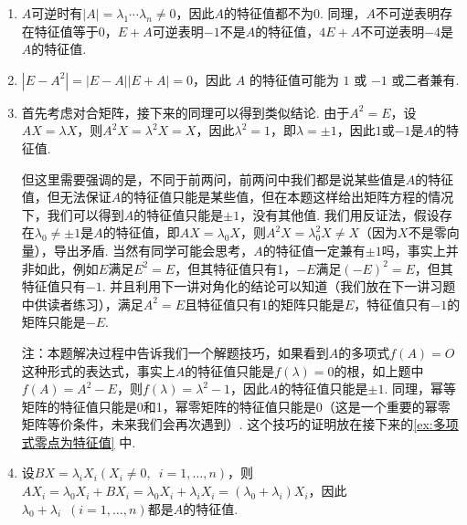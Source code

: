 \begin{solution}
    \begin{enumerate}
        \item $A$可逆时有$|A|=\lambda_1\cdots\lambda_n\neq 0$，因此$A$的特征值都不为0. 同理，$A$不可逆表明存在特征值等于0，$E+A$可逆表明$-1$不是$A$的特征值，$4E+A$不可逆表明$-4$是$A$的特征值.

        \item $|E - A^2| = |E - A||E + A| = 0$，因此 $A$ 的特征值可能为 $1$ 或 $-1$ 或二者兼有.

        \item 首先考虑对合矩阵，接下来的同理可以得到类似结论. 由于$A^2=E$，设$AX=\lambda X$，则$A^2X=\lambda^2X=X$，因此$\lambda^2=1$，即$\lambda=\pm 1$，因此$1$或$-1$是$A$的特征值.

              但这里需要强调的是，不同于前两问，前两问中我们都是说某些值是$A$的特征值，但无法保证$A$的特征值只能是某些值，但在本题这样给出矩阵方程的情况下，我们可以得到$A$的特征值只能是$\pm 1$，没有其他值. 我们用反证法，假设存在$\lambda_0\neq\pm 1$是$A$的特征值，即$AX=\lambda_0X$，则$A^2X=\lambda_0^2X\neq X$（因为$X$不是零向量），导出矛盾. 当然有同学可能会思考，$A$的特征值一定兼有$\pm 1$吗，事实上并非如此，例如$E$满足$E^2=E$，但其特征值只有1，$-E$满足$(-E)^2=E$，但其特征值只有$-1$. 并且利用下一讲对角化的结论可以知道（我们放在下一讲习题中供读者练习），满足$A^2=E$且特征值只有1的矩阵只能是$E$，特征值只有$-1$的矩阵只能是$-E$.

              注：本题解决过程中告诉我们一个解题技巧，如果看到$A$的多项式$f(A)=O$这种形式的表达式，事实上$A$的特征值只能是$f(\lambda)=0$的根，如上题中$f(A)=A^2-E$，则$f(\lambda)=\lambda^2-1$，因此$A$的特征值只能是$\pm 1$. 同理，幂等矩阵的特征值只能是0和1，幂零矩阵的特征值只能是0（这是一个重要的幂零矩阵等价条件，未来我们会再次遇到）. 这个技巧的证明放在接下来的\autoref{ex:多项式零点为特征值} 中.

        \item 设$BX=\lambda_iX_i(X_i\neq 0,\enspace i=1,\ldots,n)$，则$AX_i=\lambda_0X_i+BX_i=\lambda_0X_i+\lambda_iX_i=(\lambda_0+\lambda_i)X_i$，因此$\lambda_0+\lambda_i\enspace(i=1,\ldots,n)$都是$A$的特征值.


\end{enumerate}
\end{solution}
